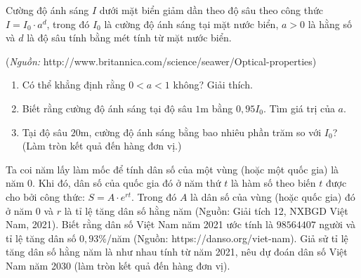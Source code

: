 \begin{bt}%
	Cường độ ánh sáng $I$ dưới mặt biển giảm dần theo độ sâu theo công thức $I=I_0\cdot a^d$, trong đó $I_0$ là cường độ ánh sáng tại mặt nước biển, $a>0$ là hằng số và $d$ là độ sâu tính bằng mét tính từ mặt nước biển.
	\begin{center}
		(\textit{Nguồn:}  http://www.britannica.com/science/seawer/Optical-properties)
	\end{center}
	\begin{enumerate}
		\item Có thể khẳng định rằng $0<a<1$ không? Giải thích.
		\item Biết rằng cường độ ánh sáng tại độ sâu $1$m bằng $0{,}95I_0$. Tìm giá trị của $a$.
		\item Tại độ sâu $20$m, cường độ ánh sáng bằng bao nhiêu phần trăm so với $I_0$? (Làm tròn kết quả đến hàng đơn vị.)
	\end{enumerate}
\end{bt}

\begin{bt}%
	Ta coi năm lấy làm mốc để tính dân số của một vùng (hoặc một quốc gia) là năm 0. Khi đó, dân số của quốc gia đó ở năm thứ $t$ là hàm số theo biến $t$ được cho bởi công thức: $S=A \cdot e^{rt}$. Trong đó $A$ là dân số của vùng (hoặc quốc gia) đó ở năm 0 và $r$ là tỉ lệ tăng dân số hằng năm (Nguồn: Giải tích 12, NXBGD Việt Nam, 2021). Biết rằng dân số Việt Nam năm 2021 ước tính là $98564407$ người và tỉ lệ tăng dân số $0{,}93\%$/năm (Nguồn: https://danso.org/viet-nam). Giả sử tỉ lệ tăng dân số hằng năm là như nhau tính từ năm 2021, nêu dự đoán dân số Việt Nam năm 2030 (làm tròn kết quả đến hàng đơn vị).
\end{bt}

